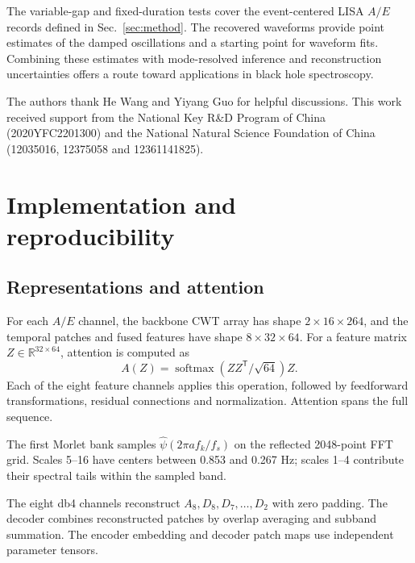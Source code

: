 \documentclass[10pt,prd,aps,a4paper,twocolumn,superscriptaddress,nofootinbib,floatfix]{revtex4-2}
\begin{document}
The variable-gap and fixed-duration tests cover the event-centered LISA $A/E$ records defined in Sec.~\ref{sec:method}. The recovered waveforms provide point estimates of the damped oscillations and a starting point for waveform fits. Combining these estimates with mode-resolved inference and reconstruction uncertainties offers a route toward applications in black hole spectroscopy.

\begin{acknowledgments}
The authors thank He Wang and Yiyang Guo for helpful discussions. This work received support from the National Key R\&D Program of China (2020YFC2201300) and the National Natural Science Foundation of China (12035016, 12375058 and 12361141825).

\end{acknowledgments}
\onecolumngrid
\clearpage
\twocolumngrid
\appendix
\section{Implementation and reproducibility}\label{app:model_analysis}
\subsection{Representations and attention}
For each $A/E$ channel, the backbone CWT array has shape $2\times16\times264$, and the temporal patches and fused features have shape $8\times32\times64$. For a feature matrix $Z\in\mathbb R^{32\times64}$, attention is computed as
\begin{equation}
A(Z)=\operatorname{softmax}(ZZ^{\mathsf T}/\sqrt{64})Z.
\end{equation}
Each of the eight feature channels applies this operation, followed by feedforward transformations, residual connections and normalization. Attention spans the full sequence.

The first Morlet bank samples $\widehat\psi(2\pi a f_k/f_s)$ on the reflected 2048-point FFT grid. Scales 5--16 have centers between 0.853 and 0.267 Hz; scales 1--4 contribute their spectral tails within the sampled band.

The eight db4 channels reconstruct $A_8,D_8,D_7,\ldots,D_2$ with zero padding. The decoder combines reconstructed patches by overlap averaging and subband summation. The encoder embedding and decoder patch maps use independent parameter tensors.
\end{document}

